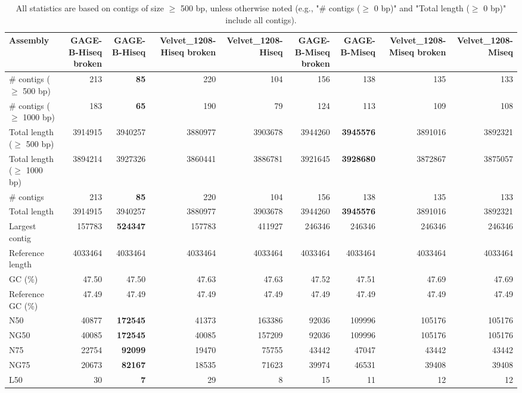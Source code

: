\documentclass[12pt,a4paper]{article}
\begin{document}
\begin{table}[ht]
\begin{center}
\caption{All statistics are based on contigs of size $\geq$ 500 bp, unless otherwise noted (e.g., "\# contigs ($\geq$ 0 bp)" and "Total length ($\geq$ 0 bp)" include all contigs).}
\begin{tabular}{|l*{8}{|r}|}
\hline
Assembly & GAGE-B-Hiseq broken & GAGE-B-Hiseq & Velvet\_1208-Hiseq broken & Velvet\_1208-Hiseq & GAGE-B-Miseq broken & GAGE-B-Miseq & Velvet\_1208-Miseq broken & Velvet\_1208-Miseq \\ \hline
\# contigs ($\geq$ 500 bp) & 213 & {\bf 85} & 220 & 104 & 156 & 138 & 135 & 133 \\ \hline
\# contigs ($\geq$ 1000 bp) & 183 & {\bf 65} & 190 & 79 & 124 & 113 & 109 & 108 \\ \hline
Total length ($\geq$ 500 bp) & 3914915 & 3940257 & 3880977 & 3903678 & 3944260 & {\bf 3945576} & 3891016 & 3892321 \\ \hline
Total length ($\geq$ 1000 bp) & 3894214 & 3927326 & 3860441 & 3886781 & 3921645 & {\bf 3928680} & 3872867 & 3875057 \\ \hline
\# contigs & 213 & {\bf 85} & 220 & 104 & 156 & 138 & 135 & 133 \\ \hline
Total length & 3914915 & 3940257 & 3880977 & 3903678 & 3944260 & {\bf 3945576} & 3891016 & 3892321 \\ \hline
Largest contig & 157783 & {\bf 524347} & 157783 & 411927 & 246346 & 246346 & 246346 & 246346 \\ \hline
Reference length & 4033464 & 4033464 & 4033464 & 4033464 & 4033464 & 4033464 & 4033464 & 4033464 \\ \hline
GC (\%) & 47.50 & 47.50 & 47.63 & 47.63 & 47.52 & 47.51 & 47.69 & 47.69 \\ \hline
Reference GC (\%) & 47.49 & 47.49 & 47.49 & 47.49 & 47.49 & 47.49 & 47.49 & 47.49 \\ \hline
N50 & 40877 & {\bf 172545} & 41373 & 163386 & 92036 & 109996 & 105176 & 105176 \\ \hline
NG50 & 40085 & {\bf 172545} & 40085 & 157209 & 92036 & 109996 & 105176 & 105176 \\ \hline
N75 & 22754 & {\bf 92099} & 19470 & 75755 & 43442 & 47047 & 43442 & 43442 \\ \hline
NG75 & 20673 & {\bf 82167} & 18535 & 71623 & 39974 & 46531 & 39408 & 39408 \\ \hline
L50 & 30 & {\bf 7} & 29 & 8 & 15 & 11 & 12 & 12 \\ \hline

\end{tabular}
\end{center}
\end{table}
\end{document}
